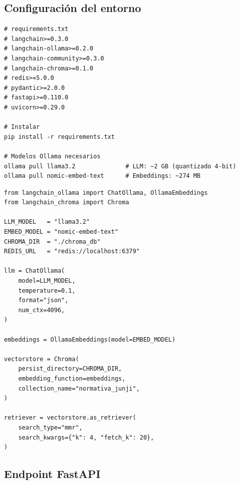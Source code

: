 \documentclass[12pt,a4paper]{article}
\begin{document}
\subsection{Configuración del entorno}

\begin{lstlisting}[style=shellstyle, caption={Instalación de dependencias}]
# requirements.txt
# langchain>=0.3.0
# langchain-ollama>=0.2.0
# langchain-community>=0.3.0
# langchain-chroma>=0.1.0
# redis>=5.0.0
# pydantic>=2.0.0
# fastapi>=0.110.0
# uvicorn>=0.29.0

# Instalar
pip install -r requirements.txt

# Modelos Ollama necesarios
ollama pull llama3.2              # LLM: ~2 GB (quantizado 4-bit)
ollama pull nomic-embed-text      # Embeddings: ~274 MB
\end{lstlisting}

\begin{lstlisting}[style=pythonstyle, caption={config.py --- Inicialización de todos los componentes}]
from langchain_ollama import ChatOllama, OllamaEmbeddings
from langchain_chroma import Chroma

LLM_MODEL   = "llama3.2"
EMBED_MODEL = "nomic-embed-text"
CHROMA_DIR  = "./chroma_db"
REDIS_URL   = "redis://localhost:6379"

llm = ChatOllama(
    model=LLM_MODEL,
    temperature=0.1,
    format="json",
    num_ctx=4096,
)

embeddings = OllamaEmbeddings(model=EMBED_MODEL)

vectorstore = Chroma(
    persist_directory=CHROMA_DIR,
    embedding_function=embeddings,
    collection_name="normativa_junji",
)

retriever = vectorstore.as_retriever(
    search_type="mmr",
    search_kwargs={"k": 4, "fetch_k": 20},
)
\end{lstlisting}

\subsection{Endpoint FastAPI}
\end{document}
